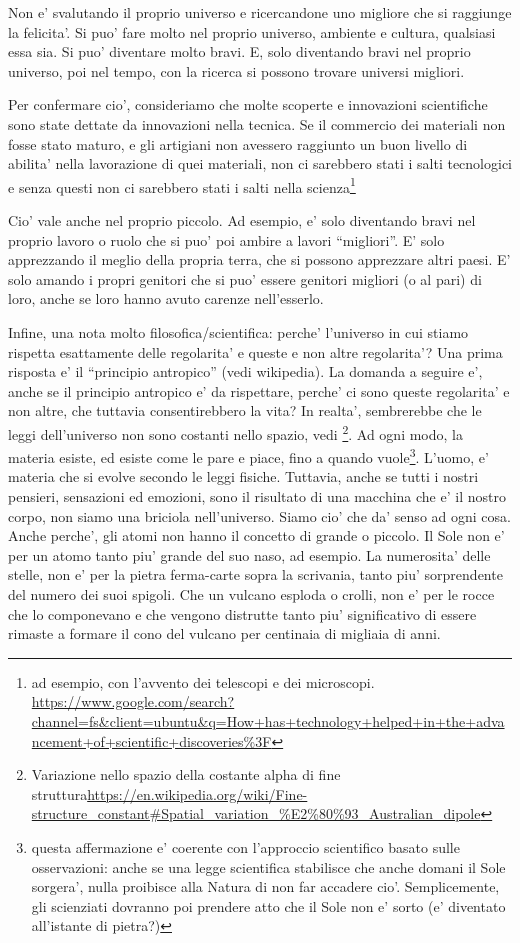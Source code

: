 Non e' svalutando il proprio universo e ricercandone uno migliore che si raggiunge la felicita'. Si puo' fare molto nel proprio universo, ambiente e cultura, qualsiasi essa sia. Si puo' diventare molto bravi. E, solo diventando bravi nel proprio universo, poi nel tempo, con la ricerca si possono trovare universi migliori.

Per confermare cio', consideriamo che molte scoperte e innovazioni scientifiche sono state dettate da innovazioni nella tecnica. Se il commercio dei materiali non fosse stato maturo, e gli artigiani non avessero raggiunto un buon livello di abilita' nella lavorazione di quei materiali, non ci sarebbero stati i salti tecnologici e senza questi non ci sarebbero stati i salti nella scienza\footnote{ad esempio, con l'avvento dei telescopi e dei microscopi. \url{https://www.google.com/search?channel=fs&client=ubuntu\&q=How+has+technology+helped+in+the+advancement+of+scientific+discoveries\%3F}}

Cio' vale anche nel proprio piccolo. Ad esempio, e' solo diventando bravi nel proprio lavoro o ruolo che si puo' poi ambire a lavori ``migliori''. E' solo apprezzando il meglio della propria terra, che si possono apprezzare altri paesi. E' solo amando i propri genitori che si puo' essere genitori migliori (o al pari) di loro, anche se loro hanno avuto carenze nell'esserlo.

Infine, una nota molto filosofica/scientifica: perche' l'universo in cui stiamo rispetta esattamente delle regolarita' e queste e non altre regolarita'? Una prima risposta e' il ``principio antropico'' (vedi wikipedia). La domanda a seguire e', anche se il principio antropico e' da rispettare, perche' ci sono queste regolarita' e non altre, che tuttavia consentirebbero la vita? In realta', sembrerebbe che le leggi dell'universo non sono costanti nello spazio, vedi \footnote{Variazione nello spazio della costante alpha di fine struttura\url{https://en.wikipedia.org/wiki/Fine-structure\_constant\#Spatial\_variation\_\%E2\%80\%93\_Australian\_dipole}}. Ad ogni modo, la materia esiste, ed esiste come le pare e piace, fino a quando vuole\footnote{questa affermazione e' coerente con l'approccio scientifico basato sulle osservazioni: anche se una legge scientifica stabilisce che anche domani il Sole sorgera', nulla proibisce alla Natura di non far accadere cio'. Semplicemente, gli scienziati dovranno poi prendere atto che il Sole non e' sorto (e' diventato all'istante di pietra?)}.
L'uomo, e' materia che si evolve secondo le leggi fisiche. Tuttavia, anche se tutti i nostri pensieri, sensazioni ed emozioni, sono il risultato di una macchina che e' il nostro corpo, non siamo una briciola nell'universo. Siamo cio' che da' senso ad ogni cosa. Anche perche', gli atomi non hanno il concetto di grande o piccolo. Il Sole non e' per un atomo tanto piu' grande del suo naso, ad esempio. La numerosita' delle stelle, non e' per la pietra ferma-carte sopra la scrivania, tanto piu' sorprendente del numero dei suoi spigoli. Che un vulcano esploda o crolli, non e' per le rocce che lo componevano e che vengono distrutte tanto piu' significativo di essere rimaste a formare il cono del vulcano per centinaia di migliaia di anni.\\

